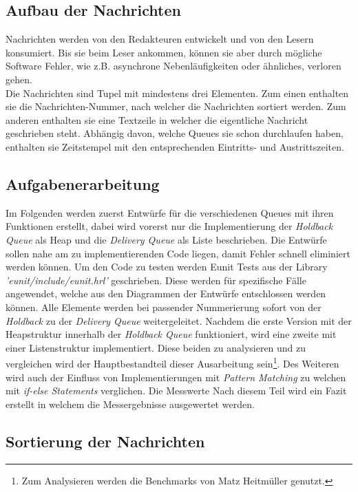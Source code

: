\subsection{Aufbau der Nachrichten}

Nachrichten werden von den Redakteuren entwickelt und von den Lesern konsumiert. Bis sie beim Leser ankommen, können sie aber durch mögliche Software Fehler, wie z.B. asynchrone Nebenläufigkeiten oder ähnliches, verloren gehen.\\
Die Nachrichten sind Tupel mit mindestens drei Elementen. Zum einen enthalten sie die Nachrichten-Nummer, nach welcher die Nachrichten sortiert werden. Zum anderen enthalten sie eine Textzeile in welcher die eigentliche Nachricht geschrieben steht. Abhängig davon, welche Queues sie schon durchlaufen haben, enthalten sie Zeitstempel mit den entsprechenden Eintritts- und Austrittszeiten. 

\subsection{Aufgabenerarbeitung}

Im Folgenden werden zuerst Entwürfe für die verschiedenen Queues mit ihren Funktionen erstellt, dabei wird vorerst nur die Implementierung der \textit{Holdback Queue} als Heap und die \textit{Delivery Queue} als Liste beschrieben. Die Entwürfe sollen nahe am zu implementierenden Code liegen, damit Fehler schnell eliminiert werden können. Um den Code zu testen werden Eunit Tests aus der Library \textit{'eunit/include/eunit.hrl'} geschrieben. Diese werden für spezifische Fälle angewendet, welche aus den Diagrammen der Entwürfe entschlossen werden können. Alle Elemente werden bei passender Nummerierung sofort von der \textit{Holdback} zu der \textit{Delivery Queue} weitergeleitet.
Nachdem die erste Version mit der Heapstruktur innerhalb der \textit{Holdback Queue} funktioniert, wird eine zweite mit einer Listenstruktur implementiert.
\newpage
Diese beiden zu analysieren und zu vergleichen wird der Hauptbestandteil dieser Ausarbeitung sein\footnote{Zum Analysieren werden die Benchmarks von Matz Heitmüller genutzt.}.
Des Weiteren wird auch der Einfluss von Implementierungen mit \textit{Pattern Matching} zu welchen mit \textit{if-else Statements} verglichen. Die Messwerte Nach diesem Teil wird ein Fazit erstellt in welchem die Messergebnisse ausgewertet werden. 

\subsection{Sortierung der Nachrichten} \label{Problemstellungen}

